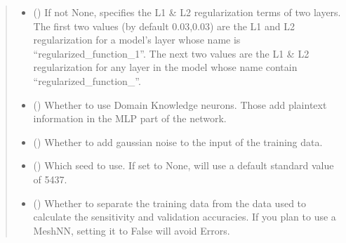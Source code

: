 \documentclass[letterpaper,10pt,english]{sphinxmanual}
\begin{document}
\begin{fulllineitems}
\begin{fulllineitems}
\begin{quote}
\begin{description}
\begin{itemize}
\item {} 
\sphinxAtStartPar
{} (\sphinxstyleliteralemphasis{\sphinxupquote{{[}}}\sphinxstyleliteralemphasis{\sphinxupquote{{]}}}\sphinxstyleliteralemphasis{\sphinxupquote{, }}\sphinxstyleliteralemphasis{\sphinxupquote{ {[}}}\sphinxstyleliteralemphasis{\sphinxupquote{,}}\sphinxstyleliteralemphasis{\sphinxupquote{,}}\sphinxstyleliteralemphasis{\sphinxupquote{,}}\sphinxstyleliteralemphasis{\sphinxupquote{{]}}}) \textendash{} If not None, specifies the L1 \& L2 regularization terms of two layers.
The first two values (by default 0.03,0.03) are the L1 and L2 regularization
for a model’s layer whose name is “regularized\_function\_1”. The next two values
are the L1 \& L2 regularization for any layer in the model whose name contain
“regularized\_function\_”.

\item {} 
\sphinxAtStartPar
{} (\sphinxstyleliteralemphasis{\sphinxupquote{, }}) \textendash{} Whether to use Domain Knowledge neurons. Those add plaintext information
in the MLP part of the network.

\item {} 
\sphinxAtStartPar
{} (\sphinxstyleliteralemphasis{\sphinxupquote{, }}) \textendash{} Whether to add gaussian noise to the input of the training data.

\item {} 
\sphinxAtStartPar
{} (\sphinxstyleliteralemphasis{\sphinxupquote{, }}) \textendash{} Which seed to use. If set to None, will use a default standard value of 5437.

\item {} 
\sphinxAtStartPar
{} (\sphinxstyleliteralemphasis{\sphinxupquote{, }}) \textendash{} Whether to separate the training data from the data used to calculate the
sensitivity and validation accuracies. If you plan to use a MeshNN, setting it
to False will avoid Errors.


\end{itemize}
\end{description}
\end{quote}
\end{fulllineitems}
\end{fulllineitems}
\end{document}

